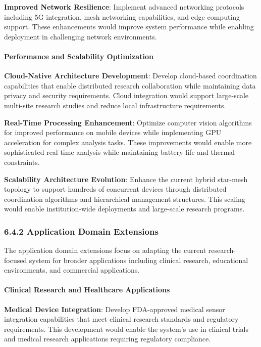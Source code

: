 \documentclass[12pt,a4paper]{article}
\begin{document}
\textbf{Improved Network Resilience}: Implement advanced networking protocols including 5G integration, mesh networking
capabilities, and edge computing support. These enhancements would improve system performance while enabling deployment
in challenging network environments.

\paragraph{Performance and Scalability Optimization}

\textbf{Cloud-Native Architecture Development}: Develop cloud-based coordination capabilities that enable distributed
research collaboration while maintaining data privacy and security requirements. Cloud integration would support
large-scale multi-site research studies and reduce local infrastructure requirements.

\textbf{Real-Time Processing Enhancement}: Optimize computer vision algorithms for improved performance on mobile devices
while implementing GPU acceleration for complex analysis tasks. These improvements would enable more sophisticated
real-time analysis while maintaining battery life and thermal constraints.

\textbf{Scalability Architecture Evolution}: Enhance the current hybrid star-mesh topology to support hundreds of concurrent
devices through distributed coordination algorithms and hierarchical management structures. This scaling would enable
institution-wide deployments and large-scale research programs.

\subsubsection{6.4.2 Application Domain Extensions}

The application domain extensions focus on adapting the current research-focused system for broader applications
including clinical research, educational environments, and commercial applications.

\paragraph{Clinical Research and Healthcare Applications}

\textbf{Medical Device Integration}: Develop FDA-approved medical sensor integration capabilities that meet clinical research
standards and regulatory requirements. This development would enable the system's use in clinical trials and medical
research applications requiring regulatory compliance.
\end{document}
